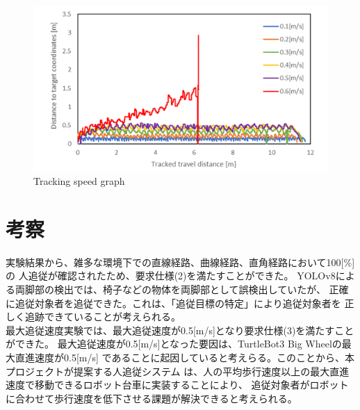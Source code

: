\begin{figure}[h]
  \begin{center}
  \includegraphics[width=150mm,clip]{figure/Maximum-tracking-speed-experimental-result.png}
  \caption{Tracking speed graph}
  \label{Tracking speed graph}
  \end{center}
\end{figure}

\section{考察}
実験結果から、雑多な環境下での直線経路、曲線経路、直角経路において100[\%]の
人追従が確認されたため、要求仕様(2)を満たすことができた。
YOLOv8による両脚部の検出では、椅子などの物体を両脚部として誤検出していたが、
正確に追従対象者を追従できた。これは、「追従目標の特定」により追従対象者を
正しく追跡できていることが考えられる。\\ \indent
最大追従速度実験では、最大追従速度が0.5[m/s]となり要求仕様(3)を満たすことができた。
最大追従速度が0.5[m/s]となった要因は、TurtleBot3 Big Wheelの最大直進速度が0.5[m/s]
であることに起因していると考えらる。このことから、本プロジェクトが提案する人追従システム
は、人の平均歩行速度以上の最大直進速度で移動できるロボット台車に実装することにより、
追従対象者がロボットに合わせて歩行速度を低下させる課題が解決できると考えられる。
